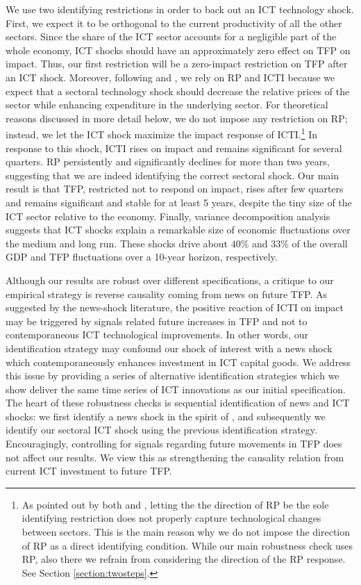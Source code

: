 \documentclass[12pt]{article}
\begin{document}
We use two identifying restrictions in order to back out an ICT technology shock. First, we expect it to be orthogonal to the current productivity of all the other sectors. Since the share of the ICT sector accounts for a negligible part of the whole economy, ICT shocks should have an approximately zero effect on TFP on impact. Thus, our first restriction will be a zero-impact restriction on TFP after an ICT shock. Moreover, following \cite{greenwood1997long} and \cite{fisher2006dynamic}, we rely on RP and ICTI because we expect that a sectoral technology shock should decrease the relative prices of the sector while enhancing expenditure in the underlying sector. For theoretical reasons discussed in more detail below, we do not impose any restriction on RP; instead, we let the ICT shock maximize the impact response of ICTI.\footnote{As pointed out by both \cite{greenwood2000role} and \cite{basu2010sector}, letting the the direction of RP be the sole identifying restriction does not properly capture technological changes between sectors. This is the main reason why we do not impose the direction of RP as a direct identifying condition. While our main robustness check uses RP, also there we refrain from considering the direction of the RP response. See Section \ref{section:twosteps}.} In response to this shock, ICTI rises on impact and remains significant for several quarters. RP persistently and significantly declines for more than two years, suggesting that we are indeed identifying the correct sectoral shock. Our main result is that TFP, restricted not to respond on impact, rises after few quarters and remains significant and stable for at least 5 years, despite the tiny size of the ICT sector relative to the economy. Finally, variance decomposition analysis suggests that ICT shocks explain a remarkable size of economic fluctuations over the medium and long run. These shocks drive about $40$\% and $33$\% of the overall GDP and TFP fluctuations over a 10-year horizon, respectively.

Although our results are robust over different specifications, a critique to our empirical strategy is reverse causality coming from news on future TFP. As suggested by the news-shock literature, the positive reaction of ICTI on impact may be triggered by signals related future increases in TFP and not to contemporaneous ICT technological improvements. In other words, our identification strategy may confound our shock of interest with a news shock which contemporaneously enhances investment in ICT capital goods. We address this issue by providing a series of alternative identification strategies which we show deliver the same time series of ICT innovations as our initial specification. The heart of these robustness checks is sequential identification of news and ICT shocks: we first identify a news shock in the spirit of \cite{barsky2011news}, and subsequently we identify our sectoral ICT shock using the previous identification strategy. Encouragingly, controlling for signals regarding future movements in TFP does not affect our results. We view this as strengthening the causality relation from current ICT investment to future TFP. 
\end{document}
